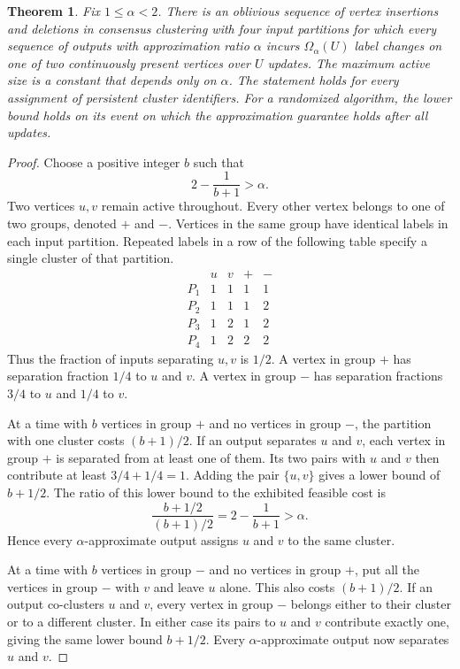 \documentclass[11pt]{article}
\newtheorem{theorem}{Theorem}[section]
\begin{document}
\begin{theorem}
\label{detext:two-barrier}
Fix $1\le\alpha<2$. There is an oblivious sequence of vertex
insertions and deletions in consensus clustering with four input partitions
for which every sequence of outputs with approximation ratio $\alpha$ incurs
$\Omega_{\alpha}(U)$ label changes on one of two continuously present
vertices over $U$ updates. The maximum active size is a constant
that depends only on $\alpha$. The statement holds for every assignment
of persistent cluster identifiers. For a randomized algorithm, the
lower bound holds on its event on which the approximation guarantee holds after all updates.
\end{theorem}
\begin{proof}
Choose a positive integer $b$ such that
\[
 2-\frac1{b+1}>\alpha.
\]
Two vertices $u,v$ remain active throughout. Every other vertex belongs
to one of two groups, denoted $+$ and $-$. Vertices in the same group
have identical labels in each input partition. Repeated labels in a row of the following table
specify a single cluster of that partition.
\[
\begin{array}{c|cccc}
 &u&v&+&-\\ \hline
 P_1&1&1&1&1\\
 P_2&1&1&1&2\\
 P_3&1&2&1&2\\
 P_4&1&2&2&2
\end{array}
\]
Thus the fraction of inputs separating $u,v$ is $1/2$. A vertex in group $+$
has separation fraction $1/4$ to $u$ and $v$. A vertex in group $-$
has separation fractions $3/4$ to $u$ and $1/4$ to $v$.

At a time with $b$ vertices in group $+$ and no vertices in group $-$, the
partition with one cluster costs $(b+1)/2$. If an output separates
$u$ and $v$, each vertex in group $+$ is separated from at least one of them.
Its two pairs with $u$ and $v$ then contribute at least
$3/4+1/4=1$. Adding the pair $\{u,v\}$ gives a lower bound of $b+1/2$.
The ratio of this lower bound to the exhibited feasible cost is
\[
 \frac{b+1/2}{(b+1)/2}=2-\frac1{b+1}>\alpha.
\]
Hence every $\alpha$-approximate output assigns $u$ and $v$ to the same cluster.

At a time with $b$ vertices in group $-$ and no vertices in group $+$, put
all the vertices in group $-$ with $v$ and leave $u$ alone. This also
costs $(b+1)/2$. If an output co-clusters $u$ and $v$, every vertex in group $-$
belongs either to their cluster or to a different cluster. In either case its
pairs to $u$ and $v$ contribute exactly one, giving the same lower bound
$b+1/2$. Every $\alpha$-approximate output now separates $u$ and $v$.


\end{proof}
\end{document}
